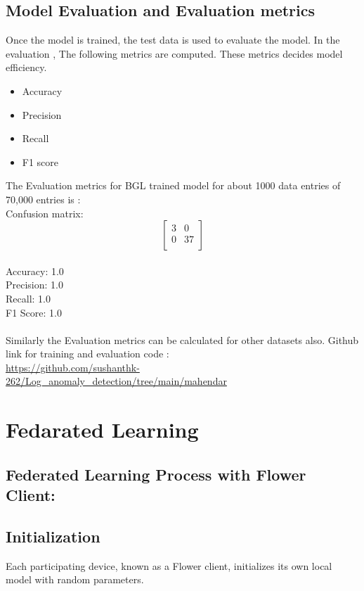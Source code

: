 \documentclass[titlepage]{article}
\begin{document}
\subsection{Model Evaluation and Evaluation metrics}
Once the model is trained, the test data is used to evaluate the model. In the evaluation , The following metrics are computed. These metrics decides model efficiency.
\begin{itemize}
    \item Accuracy
    \item Precision
    \item Recall
    \item F1 score
\end{itemize}
The Evaluation metrics for BGL trained model for about 1000 data entries of 70,000 entries is :\\
Confusion matrix:
\[
\begin{bmatrix}
  3 & 0 \\
  0 & 37 \\
\end{bmatrix}
\]
\\
Accuracy: 1.0 \\
Precision: 1.0 \\
Recall: 1.0 \\
F1 Score: 1.0\\
\\
Similarly the Evaluation metrics can be calculated for other datasets also.
Github link for training and evaluation code : \\
 \href{https://github.com/sushanthk-262/Log_anomaly_detection/tree/main/mahendar}{https://github.com/sushanthk-262/Log\_anomaly\_detection/tree/main/mahendar} \\

 
\section{Fedarated Learning}
\subsection{Federated Learning Process with Flower Client:}

\subsection{Initialization}
	Each participating device, known as a Flower client, initializes its own local model with random parameters.
	
\end{document}
